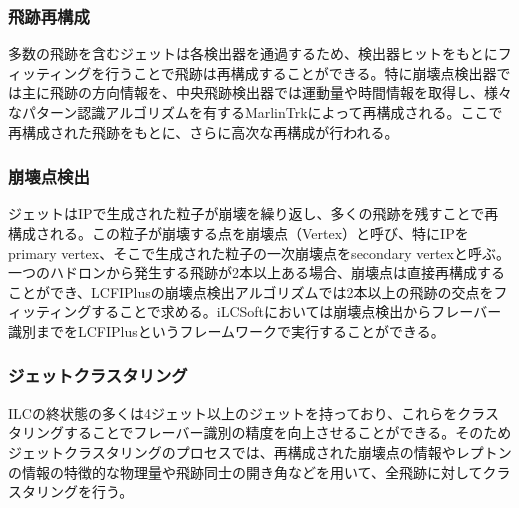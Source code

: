 \subsubsection{飛跡再構成}
多数の飛跡を含むジェットは各検出器を通過するため、検出器ヒットをもとにフィッティングを行うことで飛跡は再構成することができる。特に崩壊点検出器では主に飛跡の方向情報を、中央飛跡検出器では運動量や時間情報を取得し、様々なパターン認識アルゴリズムを有するMarlinTrkによって再構成される。ここで再構成された飛跡をもとに、さらに高次な再構成が行われる。
\subsubsection{崩壊点検出}
ジェットはIPで生成された粒子が崩壊を繰り返し、多くの飛跡を残すことで再構成される。この粒子が崩壊する点を崩壊点（Vertex）と呼び、特にIPをprimary vertex、そこで生成された粒子の一次崩壊点をsecondary vertexと呼ぶ。一つのハドロンから発生する飛跡が2本以上ある場合、崩壊点は直接再構成することができ、LCFIPlusの崩壊点検出アルゴリズムでは2本以上の飛跡の交点をフィッティングすることで求める。iLCSoftにおいては崩壊点検出からフレーバー識別までをLCFIPlusというフレームワークで実行することができる。
\subsubsection{ジェットクラスタリング}
ILCの終状態の多くは4ジェット以上のジェットを持っており、これらをクラスタリングすることでフレーバー識別の精度を向上させることができる。そのためジェットクラスタリングのプロセスでは、再構成された崩壊点の情報やレプトンの情報の特徴的な物理量や飛跡同士の開き角などを用いて、全飛跡に対してクラスタリングを行う。
